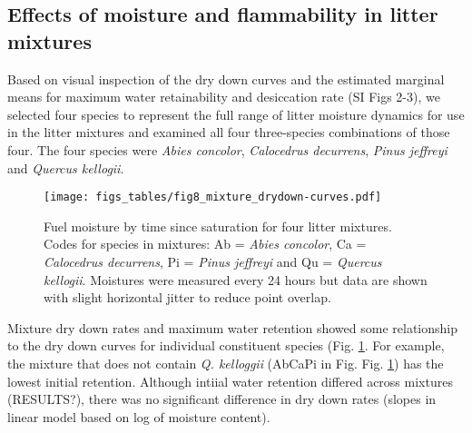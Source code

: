 \documentclass[fire,article,submit,moreauthors,pdftex]{Definitions/mdpi}
\begin{document}
\begin{table}[H]
  \caption{Generalized linear mixed model results for fuel consumption as a function of time since wetting with taxonomic group as a fixed effect and species as a nested random effect. These are beta regression models. The analysis of deviance table below shows deviance comparisons for the simplest null model with only intercept and random effect (model 1), for a taxon effect only (model 2), for a taxon and mosture content effect (model 3) and for the full model including the taxon by moisture interaction (model 4). Coefficient estimates are in SI Table 5.}
  \label{tab:consume_time_anova}
\centering

\end{table}


\subsection{Effects of moisture and flammability in litter mixtures}

Based on visual inspection of the dry down curves and the estimated marginal means for maximum water retainability and desiccation rate (SI Figs 2-3), we selected four species to represent the full range of litter moisture dynamics for use in the litter mixtures and examined all four three-species combinations of those four. The four species were \emph{Abies concolor}, \emph{Calocedrus decurrens}, \emph{Pinus jeffreyi} and \emph{Quercus kellogii}.

\begin{figure}[H]
  \centering
\texttt{[image: figs\_tables/fig8\_mixture\_drydown-curves.pdf]}
\caption{Fuel moisture by time since saturation for four litter mixtures.  Codes for species in mixtures: Ab = \emph{Abies concolor}, Ca = \emph{Calocedrus decurrens}, Pi = \emph{Pinus jeffreyi} and Qu = \emph{Quercus kellogii}. Moistures were measured every 24 hours but data are shown with slight horizontal jitter to reduce point overlap.}
  \label{fig:mixture_dry_down}
\end{figure}

Mixture dry down rates and maximum water retention showed some relationship to the dry down curves for individual constituent species (Fig. \ref{fig:mixture_dry_down}. For example, the mixture that does not contain \emph{Q. kelloggii} (AbCaPi in Fig. Fig. \ref{fig:mixture_dry_down}) has the lowest initial retention. Although intiial water retention differed across mixtures (RESULTS?), there was no significant difference in dry down rates (slopes in linear model based on log of moisture content).
\end{document}

